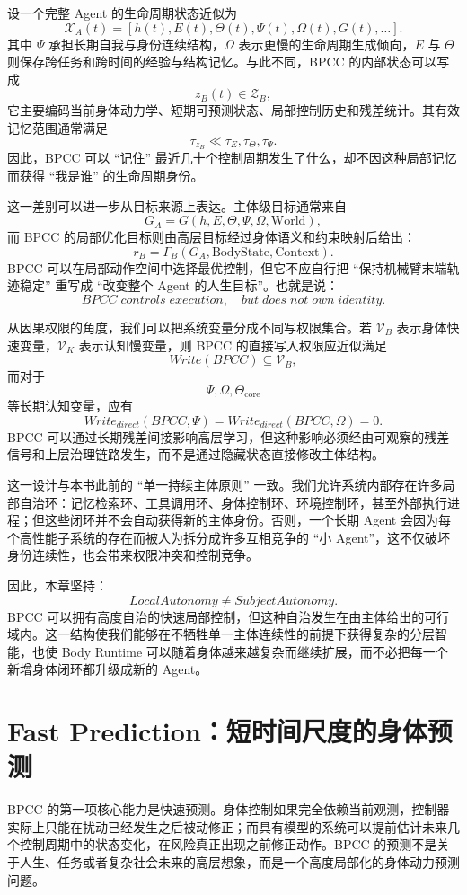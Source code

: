 设一个完整 Agent 的生命周期状态近似为
\[
\mathcal X_A(t)
=
\left[
h(t),E(t),\Theta(t),\Psi(t),\Omega(t),G(t),\ldots
\right].
\]
其中 $\Psi$ 承担长期自我与身份连续结构，$\Omega$ 表示更慢的生命周期生成倾向，$E$ 与 $\Theta$ 则保存跨任务和跨时间的经验与结构记忆。与此不同，BPCC 的内部状态可以写成
\[
z_B(t)
\in
\mathcal Z_B,
\]
它主要编码当前身体动力学、短期可预测状态、局部控制历史和残差统计。其有效记忆范围通常满足
\[
\tau_{z_B}
\ll
\tau_E,\tau_\Theta,\tau_\Psi.
\]
因此，BPCC 可以 ``记住'' 最近几十个控制周期发生了什么，却不因这种局部记忆而获得 ``我是谁'' 的生命周期身份。

这一差别可以进一步从目标来源上表达。主体级目标通常来自
\[
G_A
=
G(h,E,\Theta,\Psi,\Omega,\text{World}),
\]
而 BPCC 的局部优化目标则由高层目标经过身体语义和约束映射后给出：
\[
r_B
=
\Gamma_B(G_A,\text{BodyState},\text{Context}).
\]
BPCC 可以在局部动作空间中选择最优控制，但它不应自行把 ``保持机械臂末端轨迹稳定'' 重写成 ``改变整个 Agent 的人生目标''。也就是说：
\[
\boxed{
BPCC\;controls\;execution,
\quad
but\;does\;not\;own\;identity.
}
\]

从因果权限的角度，我们可以把系统变量分成不同写权限集合。若 $\mathcal V_B$ 表示身体快速变量，$\mathcal V_K$ 表示认知慢变量，则 BPCC 的直接写入权限应近似满足
\[
Write(BPCC)
\subseteq
\mathcal V_B,
\]
而对于
\[
\Psi,\Omega,\Theta_{\mathrm{core}}
\]
等长期认知变量，应有
\[
Write_{direct}(BPCC,\Psi)
=
Write_{direct}(BPCC,\Omega)
=
0.
\]
BPCC 可以通过长期残差间接影响高层学习，但这种影响必须经由可观察的残差信号和上层治理链路发生，而不是通过隐藏状态直接修改主体结构。

这一设计与本书此前的 ``单一持续主体原则'' 一致。我们允许系统内部存在许多局部自治环：记忆检索环、工具调用环、身体控制环、环境控制环，甚至外部执行进程；但这些闭环并不会自动获得新的主体身份。否则，一个长期 Agent 会因为每个高性能子系统的存在而被人为拆分成许多互相竞争的 ``小 Agent''，这不仅破坏身份连续性，也会带来权限冲突和控制竞争。

因此，本章坚持：
\[
\boxed{
LocalAutonomy
\neq
SubjectAutonomy.
}
\]
BPCC 可以拥有高度自治的快速局部控制，但这种自治发生在由主体给出的可行域内。这一结构使我们能够在不牺牲单一主体连续性的前提下获得复杂的分层智能，也使 Body Runtime 可以随着身体越来越复杂而继续扩展，而不必把每一个新增身体闭环都升级成新的 Agent。

\section{Fast Prediction：短时间尺度的身体预测}

BPCC 的第一项核心能力是快速预测。身体控制如果完全依赖当前观测，控制器实际上只能在扰动已经发生之后被动修正；而具有模型的系统可以提前估计未来几个控制周期中的状态变化，在风险真正出现之前修正动作。BPCC 的预测不是关于人生、任务或者复杂社会未来的高层想象，而是一个高度局部化的身体动力预测问题。

